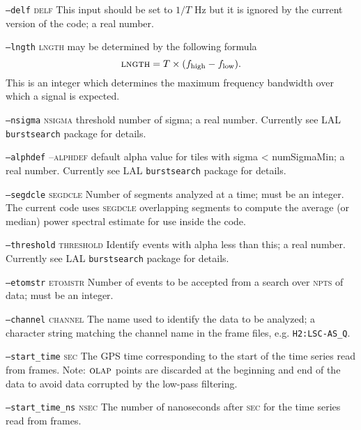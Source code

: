 \begin{entry}
\begin{entry}
\item[\texttt{--delf} \textsc{delf}] This input should be set to $1/T$ Hz but
it is ignored by the current version of the code;
a real number.

\item[\texttt{--lngth} \textsc{lngth}] may be determined by the following
formula
\[
\mbox{\textsc{lngth}} = T \times ({f_{\mathrm{high}} - f_{\mathrm{low}}}) .
\]
This is an integer which determines the maximum frequency bandwidth
over which a signal is expected.  

\item[\texttt{--nsigma} \textsc{nsigma}] threshold number of sigma;
a real number.
Currently see LAL \texttt{burstsearch} package for details.

\item[\texttt{--alphdef} --\textsc{alphdef}] default alpha value for tiles
with sigma < numSigmaMin;
a real number. Currently see LAL \texttt{burstsearch}
package for details.

\item[\texttt{--segdcle} \textsc{segdcle}] Number of segments analyzed
at a time;  must be an integer.  The current code uses
\textsc{segdcle} overlapping segments to compute the average (or
median) power spectral estimate for use inside the code.

\item[\texttt{--threshold} \textsc{threshold}] Identify events with alpha
less than this;
a real number.  Currently see LAL \texttt{burstsearch} package for
details.

\item[\texttt{--etomstr} \textsc{etomstr}] Number of events to be
accepted from a search over \textsc{npts} of data;  must be an
integer.

\item[\texttt{--channel} \textsc{channel}] The name used to identify the
data to be analyzed;  a character string matching
the channel name in the frame files,  e.g. \texttt{H2:LSC-AS\_Q}.

\item[\texttt{--start\_time} \textsc{sec}] The GPS time
corresponding to the start of the time series read from frames.  Note:  
$\textsc{olap}$ points are discarded at the beginning and end of the
data to avoid data corrupted by the low-pass filtering.

\item[\texttt{--start\_time\_ns} \textsc{nsec}] The number of
nanoseconds after \textsc{sec} for the time series read from frames. 


\end{entry}
\end{entry}
